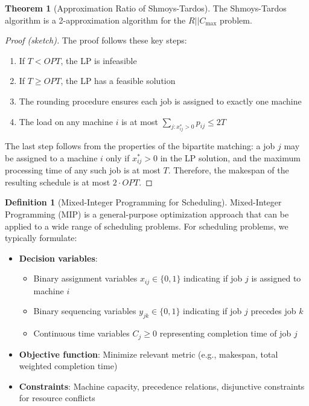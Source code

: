 \documentclass{article}
\theoremstyle{definition}
\newtheorem{theorem}{Theorem}
\newtheorem{definition}{Definition}
\begin{document}
\begin{theorem}[Approximation Ratio of Shmoys-Tardos]
The Shmoys-Tardos algorithm is a 2-approximation algorithm for the $R||C_{\max}$ problem.
\begin{proof}[Proof (sketch)]
The proof follows these key steps:
\begin{enumerate}
    \item If $T < OPT$, the LP is infeasible
    \item If $T \geq OPT$, the LP has a feasible solution
    \item The rounding procedure ensures each job is assigned to exactly one machine
    \item The load on any machine $i$ is at most $\sum_{j:x_{ij}^* > 0} p_{ij} \leq 2T$
\end{enumerate}

The last step follows from the properties of the bipartite matching: a job $j$ may be assigned to a machine $i$ only if $x_{ij}^* > 0$ in the LP solution, and the maximum processing time of any such job is at most $T$. Therefore, the makespan of the resulting schedule is at most $2 \cdot OPT$.
\end{proof}
\end{theorem}


\begin{definition}[Mixed-Integer Programming for Scheduling]
Mixed-Integer Programming (MIP) is a general-purpose optimization approach that can be applied to a wide range of scheduling problems. For scheduling problems, we typically formulate:
\begin{itemize}
    \item \textbf{Decision variables}: 
    \begin{itemize}
        \item Binary assignment variables $x_{ij} \in \{0, 1\}$ indicating if job $j$ is assigned to machine $i$
        \item Binary sequencing variables $y_{jk} \in \{0, 1\}$ indicating if job $j$ precedes job $k$
        \item Continuous time variables $C_j \geq 0$ representing completion time of job $j$
    \end{itemize}
    \item \textbf{Objective function}: Minimize relevant metric (e.g., makespan, total weighted completion time)
    \item \textbf{Constraints}: Machine capacity, precedence relations, disjunctive constraints for resource conflicts
\end{itemize}
\end{definition}
\end{document}
